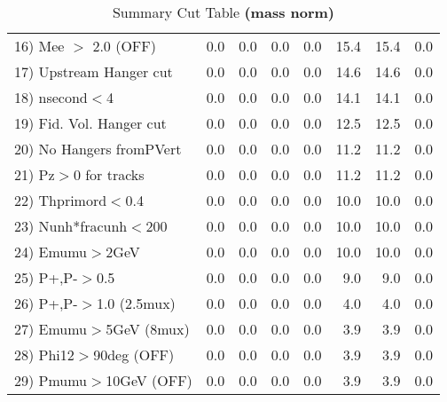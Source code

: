 \begin{table}[h!]
{{\begin{tabular}{||l||r|r|r|r|r||r||r||}
 16) Mee $>$ 2.0  (OFF)   &       0.0 &       0.0 &       0.0 &       0.0 &      15.4 &      15.4 &       0.0 \\
 17) Upstream Hanger cut  &       0.0 &       0.0 &       0.0 &       0.0 &      14.6 &      14.6 &       0.0 \\
 18) nsecond$<$4          &       0.0 &       0.0 &       0.0 &       0.0 &      14.1 &      14.1 &       0.0 \\
 19) Fid. Vol. Hanger cut &       0.0 &       0.0 &       0.0 &       0.0 &      12.5 &      12.5 &       0.0 \\
 20) No Hangers fromPVert &       0.0 &       0.0 &       0.0 &       0.0 &      11.2 &      11.2 &       0.0 \\
 21) Pz$>$0 for tracks    &       0.0 &       0.0 &       0.0 &       0.0 &      11.2 &      11.2 &       0.0 \\
 22) Thprimord$<$0.4      &       0.0 &       0.0 &       0.0 &       0.0 &      10.0 &      10.0 &       0.0 \\
 23) Nunh*fracunh$<$200   &       0.0 &       0.0 &       0.0 &       0.0 &      10.0 &      10.0 &       0.0 \\
 24) Emumu$>$2GeV         &       0.0 &       0.0 &       0.0 &       0.0 &      10.0 &      10.0 &       0.0 \\
 25) P+,P-$>$0.5          &       0.0 &       0.0 &       0.0 &       0.0 &       9.0 &       9.0 &       0.0 \\
 26) P+,P-$>$1.0 (2.5mux) &       0.0 &       0.0 &       0.0 &       0.0 &       4.0 &       4.0 &       0.0 \\
 27) Emumu$>$5GeV  (8mux) &       0.0 &       0.0 &       0.0 &       0.0 &       3.9 &       3.9 &       0.0 \\
 28) Phi12$>$90deg  (OFF) &       0.0 &       0.0 &       0.0 &       0.0 &       3.9 &       3.9 &       0.0 \\
 29) Pmumu$>$10GeV  (OFF) &       0.0 &       0.0 &       0.0 &       0.0 &       3.9 &       3.9 &       0.0 \\
 \hline
 \hline
 \end{tabular}
 \caption{Summary Cut Table \textbf{ (mass norm) }}
 \label{tab-sumcut}
 }}
 \end{table}
 \endinput
